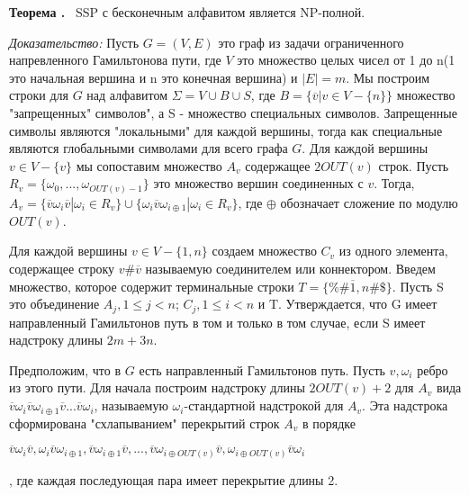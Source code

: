 \documentclass[11pt,a4paper]{article}
\newcommand\ifnonempty[2]{\ifthenelse{\equal{#1}{}}{}{#2}}
\newcounter{thm}
\newcommand{\thm}[1][]{\smallskip\par\hangafter=1\normalsize\textbf{Теорема \refstepcounter{thm}\thethm\ifnonempty{#1}{ (#1)}.}~}
\begin{document}
\thm
SSP с бесконечным алфавитом является  NP-полной.
\par
\textit{Доказательство:}
Пусть $G = (V, E)$ это граф из задачи ограниченного напревленного Гамильтонова пути, где $V$ это множество целых чисел от 1 до n(1 это начальная вершина и n это конечная вершина) и $|E| = m$.
Мы построим строки для $G$ над алфавитом $\Sigma = V \cup B \cup S$, где $B = \{\overline{v}| v \in V - \{n\} \}$ множество "запрещенных" символов", а S - множество специальных символов.
Запрещенные символы являются "локальными" для каждой вершины, тогда как специальные являются глобальными символами для всего графа $G$.
Для каждой вершины $v \in V - \{v\}$ мы сопоставим множество $A_v$ содержащее $2OUT(v)$ строк. Пусть $R_v = \{\omega_0, ..., \omega_{OUT(v) - 1}\}$ это множество вершин соединенных с $v$.
Тогда, $A_v = \{\overline{v}\omega_i\overline{v}|\omega_i \in R_v\} \cup \{\omega_i \overline{v}\omega_{i \oplus 1}| \omega_i \in R_v\}$, где $\oplus$ обозначает сложение по модулю $OUT(v)$.
\par
Для каждой вершины $v \in V - \{1, n\}$ создаем множество $C_v$ из одного элемента, содержащее строку $v \# \overline{v}$ называемую соединителем или коннектором.
Введем множество, которое содержит терминальные строки $T = \{\%\#\overline{1}, n\#\$\}$. Пусть S это объединение $A_j, 1 \le j < n$; $C_j, 1 \le i < n$ и T.
Утверждается, что G имеет направленный Гамильтонов путь в том и только в том случае, если S имеет надстроку длины $2m + 3n$.
\par
Предположим, что в $G$ есть направленный Гамильтонов путь. Пусть $v, \omega_i$ ребро из этого пути. Для начала построим надстроку длины $2OUT(v) + 2$ для $A_v$ вида
$\overline{v}\omega_i\overline{v}\omega_{i \oplus 1}\overline{v}...\overline{v}\omega_i$, называемую $\omega_i$-стандартной надстрокой для $A_v$.
Эта надстрока сформирована "схлапыванием" перекрытий строк $A_v$ в порядке
\begin{center}
$\overline{v}\omega_i\overline{v}, \omega_i\overline{v}\omega_{i \oplus 1}, \overline{v}\omega_{i \oplus1}\overline{v}, ...,
\overline{v}\omega_{i \oplus OUT(v)}\overline{v}, \omega_{i \oplus OUT(v)}\overline{v}\omega_i$
\end{center}
, где каждая последующая пара имеет перекрытие длины 2.
\end{document}
